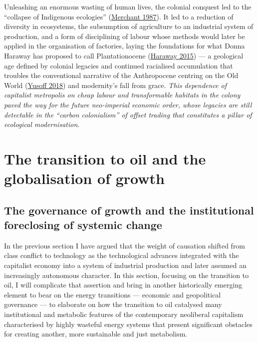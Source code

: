 \documentclass[a4paper, nobind]{templates/ociamthesis}
\begin{document}
Unleashing an enormous wasting of human lives, the colonial conquest led to the ``collapse of Indigenous ecologies'' (\protect\hyperlink{ref-merchant_theoretical_1987}{Merchant 1987}). It led to a reduction of diversity in ecosystems, the subsumption of agriculture to an industrial system of production, and a form of disciplining of labour whose methods would later be applied in the organisation of factories, laying the foundations for what Donna Haraway has proposed to call Plantationocene (\protect\hyperlink{ref-haraway_anthropocene_2015}{Haraway 2015}) --- a geological age defined by colonial legacies and continued racialised accumulation that troubles the conventional narrative of the Anthropocene centring on the Old World (\protect\hyperlink{ref-yusoff_billion_2018}{Yusoff 2018}) and modernity's fall from grace. \emph{This dependence of capitalist metropolis on cheap labour and transformable habitats in the colony paved the way for the future neo-imperial economic order, whose legacies are still detectable in the ``carbon colonialism'' of offset trading that constitutes a pillar of ecological modernisation}.

\hypertarget{the-transition-to-oil-and-the-globalisation-of-growth}{%
\section{The transition to oil and the globalisation of growth}\label{the-transition-to-oil-and-the-globalisation-of-growth}}

\hypertarget{the-governance-of-growth-and-the-institutional-foreclosing-of-systemic-change}{%
\subsection{The governance of growth and the institutional foreclosing of systemic change}\label{the-governance-of-growth-and-the-institutional-foreclosing-of-systemic-change}}

In the previous section I have argued that the weight of causation shifted from class conflict to technology as the technological advances integrated with the capitalist economy into a system of industrial production and later assumed an increasingly autonomous character. In this section, focusing on the transition to oil, I will complicate that assertion and bring in another historically emerging element to bear on the energy transitions --- economic and geopolitical governance --- to elaborate on how the transition to oil catalysed many institutional and metabolic features of the contemporary neoliberal capitalism characterised by highly wasteful energy systems that present significant obstacles for creating another, more sustainable and just metabolism.
\end{document}
